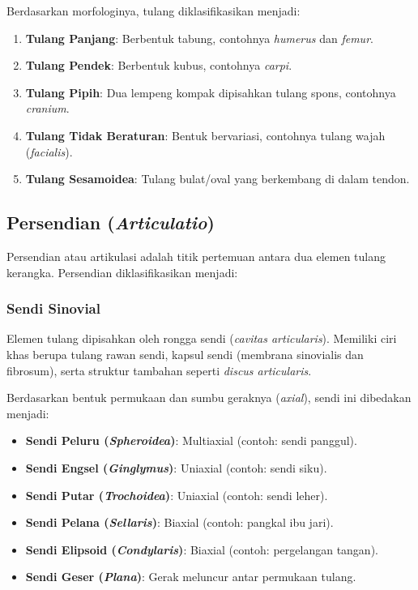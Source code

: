 \begin{itemize}
    
    Berdasarkan morfologinya, tulang diklasifikasikan menjadi:
    \begin{enumerate}
        \item \textbf{Tulang Panjang}: Berbentuk tabung, contohnya \textit{humerus} dan \textit{femur}.
        \item \textbf{Tulang Pendek}: Berbentuk kubus, contohnya \textit{carpi}.
        \item \textbf{Tulang Pipih}: Dua lempeng kompak dipisahkan tulang spons, contohnya \textit{cranium}.
        \item \textbf{Tulang Tidak Beraturan}: Bentuk bervariasi, contohnya tulang wajah (\textit{facialis}).
        \item \textbf{Tulang Sesamoidea}: Tulang bulat/oval yang berkembang di dalam tendon.
    \end{enumerate}
 \end{itemize}

 
\subsection[Persendian (Articulatio)]{Persendian (\textit{Articulatio})}
\label{subsec:persendian}

Persendian atau artikulasi adalah titik pertemuan antara dua elemen tulang kerangka. Persendian diklasifikasikan menjadi:

\subsubsection{Sendi Sinovial}
Elemen tulang dipisahkan oleh rongga sendi (\textit{cavitas articularis}). Memiliki ciri khas berupa tulang rawan sendi, kapsul sendi (membrana sinovialis dan fibrosum), serta struktur tambahan seperti \textit{discus articularis}.

Berdasarkan bentuk permukaan dan sumbu geraknya (\textit{axial}), sendi ini dibedakan menjadi:
\begin{itemize}
    \item \textbf{Sendi Peluru (\textit{Spheroidea})}: Multiaxial (contoh: sendi panggul).
    \item \textbf{Sendi Engsel (\textit{Ginglymus})}: Uniaxial (contoh: sendi siku).
    \item \textbf{Sendi Putar (\textit{Trochoidea})}: Uniaxial (contoh: sendi leher).
    \item \textbf{Sendi Pelana (\textit{Sellaris})}: Biaxial (contoh: pangkal ibu jari).
    \item \textbf{Sendi Elipsoid (\textit{Condylaris})}: Biaxial (contoh: pergelangan tangan).
    \item \textbf{Sendi Geser (\textit{Plana})}: Gerak meluncur antar permukaan tulang.
\end{itemize}

